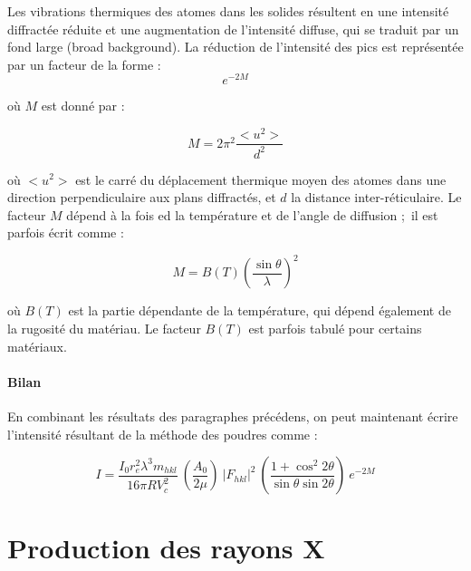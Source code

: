 Les vibrations thermiques des atomes dans les solides résultent en une intensité diffractée réduite et une augmentation de l'intensité diffuse, qui se traduit par un fond large (broad background). La réduction de l'intensité des pics est représentée par un facteur de la forme :
\begin{equation}
    e^{-2M}
\end{equation}

où $M$ est donné par :

\begin{equation}
    M = 2 \pi^2 \frac{<u^2>}{d^2}
\end{equation}

où $<u^2>$ est le carré du déplacement thermique moyen des atomes dans une direction perpendiculaire aux plans diffractés, et $d$ la distance inter-réticulaire. Le facteur $M$ dépend à la fois ed la température et de l'angle de diffusion ; il est parfois écrit comme :

\begin{equation}
    M = B(T) \left( \frac{\sin \theta}{\lambda} \right)^2
\end{equation}

où $B(T)$ est la partie dépendante de la température, qui dépend également de la rugosité du matériau. Le facteur $B(T)$ est parfois tabulé pour certains matériaux.

\paragraph{Bilan}

En combinant les résultats des paragraphes précédens, on peut maintenant écrire l'intensité résultant de la méthode des poudres comme :

\begin{equation}
    I = 
        \frac{I_0 r_e^2 \lambda^3 m_{hkl}}{16\pi R V_c^2}\ 
        \left(\frac{A_0}{2\mu} \right) \
        |F_{hkl}|^2 \ 
        \left( \frac{1+\cos^2 2\theta}{\sin\theta \sin 2\theta} \right)\ 
        e^{-2M}
\end{equation}

\section{Production des rayons X}
